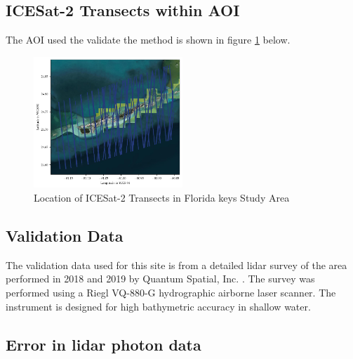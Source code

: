 \subsection{ICESat-2 Transects within AOI}
The AOI used the validate the method is shown in figure \ref{fig:keys_transects} below.
\begin{figure}[h]
    \centering
    \includegraphics[width=0.5\textwidth]{figures/florida_keys_tracklines.pdf}
    \caption{Location of ICESat-2 Transects in Florida keys Study Area}
    \label{fig:keys_transects}
\end{figure}
\subsection{Validation Data}
The validation data used for this site is from a detailed lidar survey of the area performed in 2018 and 2019 by Quantum Spatial, Inc. \parencite{Keys2019Lidar}. The survey was performed using a Riegl VQ-880-G hydrographic airborne laser scanner. The instrument is designed for high bathymetric accuracy in shallow water.
\subsection{Error in lidar photon data}

% 

% 

